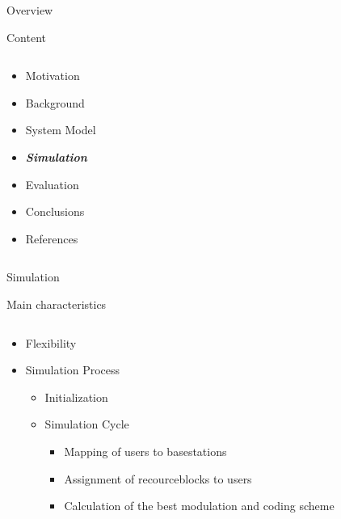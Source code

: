 \documentclass[xcolor={cmyk}]{beamer}
\begin{document}
\begin{frame}{Overview}
	\begin{block}{Content}
		\begin{columns}
			\begin{column}{.9\textwidth}
				\begin{itemize}
					\item Motivation
					\item Background
					\item System Model
					\item \textbf{\emph{Simulation}}
					\item Evaluation
					\item Conclusions
					\item References
				\end{itemize}
			\end{column}
		\end{columns}
	\end{block}
\end{frame}

 \begin{frame}{Simulation}
	 \begin{block}{Main characteristics}
	 	\begin{columns}
			\begin{column}{.9\textwidth}
				\begin{itemize}
					\item Flexibility
					\item Simulation Process
					\begin{itemize}
						\item Initialization
						\item Simulation Cycle
						\begin{itemize}
							\item Mapping of users to basestations
							\item Assignment of recourceblocks to users
							\item Calculation of the best modulation and coding scheme
					 	\end{itemize}
					 \end{itemize}
					
				 \end{itemize}
			\end{column}
		\end{columns}
	 \end{block}
 \end{frame}
 
\end{document}
